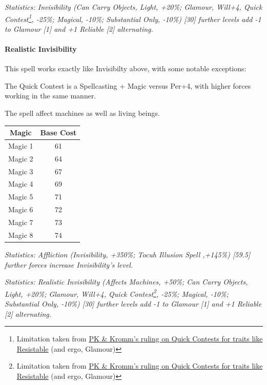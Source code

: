 \begin{multicols}{3}
	\textcolor{OliveGreen}{\textit{Statistics: Invisibility (Can Carry Objects, Light, +20\%; Glamour, Will+4, Quick Contest\footnote{Limitation taken from \textcolor{Blue}{\href{http://forums.sjgames.com/showpost.php?p=669736&postcount=2}{PK \& Kromm's ruling on Quick Contests for traits like Resistable}} (and ergo, Glamour)}, -25\%; Magical, -10\%; Substantial Only, -10\%) [30] further levels add -1 to Glamour [1] and +1 Reliable [2] alternating.}}
	
	\paragraph{Realistic Invisibility}
	
	This spell works exactly like Invisibilty above, with some notable exceptions:
	
	The Quick Contest is a Spellcasting + Magic versus Per+4, with higher forces working in the same manner.
	
	The spell affect machines as well as living beings.
	
	\begin{center}
		\begin{tabular}{|c|c|}
			\hline
			Magic & Base Cost \\
			\hline
			\hline
			Magic 1 & 61\\
			Magic 2 & 64 \\
			Magic 3 & 67 \\
			Magic 4 & 69 \\
			Magic 5 & 71 \\
			Magic 6 & 72 \\
			Magic 7 & 73 \\
			Magic 8 & 74 \\
			\hline
		\end{tabular}
	\end{center}	
	
	\textcolor{OliveGreen}{\textit{Statistics: Affliction (Invisibility, +350\%; Tocuh Illusion Spell ,+145\%) [59.5]  further forces increase Invisibility's level. }}
	
	\textcolor{OliveGreen}{\textit{Statistics: Realistic Invisibility (Affects Machines, +50\%; Can Carry Objects, Light, +20\%; Glamour, Will+4, Quick Contest\footnote{Limitation taken from \textcolor{Blue}{\href{http://forums.sjgames.com/showpost.php?p=669736&postcount=2}{PK \& Kromm's ruling on Quick Contests for traits like Resistable}} (and ergo, Glamour)}, -25\%; Magical, -10\%; Substantial Only, -10\%) [30] further levels add -1 to Glamour [1] and +1 Reliable [2] alternating.}}
	

\end{multicols}
